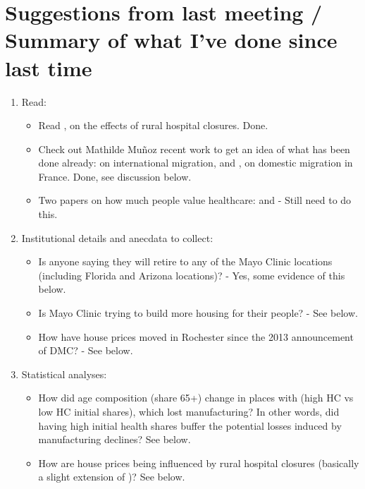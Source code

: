 \documentclass[11pt]{article}
\begin{document}
\section{Suggestions from last meeting / Summary of what I've done since last time}
\begin{enumerate}
    \item Read: 
\begin{itemize}
\item Read \cite{AlexanderRichards2023}, on the effects of rural hospital closures. Done. 
\item Check out Mathilde Mu\~noz recent work to get an idea of what has been done already: \citep{KalinLevyMunoz2024} on international migration, and \citep{BadillaMarotoFaberLevyMunoz2024}, on domestic migration in France. Done, see discussion below. 
\item Two papers on how much people value healthcare: \citep{FinkelsteinHendrenLuttmer2019} and \citep{FinkelsteinHendrenShepard2019} - Still need to do this.
\end{itemize}

\item Institutional details and anecdata to collect:
\begin{itemize}
    \item Is anyone saying they will retire to any of the Mayo Clinic locations (including Florida and Arizona locations)? - Yes, some evidence of this below. 
\item Is Mayo Clinic trying to build more housing for their people? - See below. 

\item How have house prices moved in Rochester since the 2013 announcement of DMC?  - See below. 
\end{itemize}


\item Statistical analyses:
\begin{itemize}
\item How did age composition (share 65+) change in places with (high HC vs low HC initial shares), which lost manufacturing? In other words, did having high initial health shares buffer the potential losses induced by manufacturing declines? See below. 
\item How are house prices being influenced by rural hospital closures (basically a slight extension of \cite{AlexanderRichards2023})? See below. 
\end{itemize} %



\end{enumerate}
\end{document}
